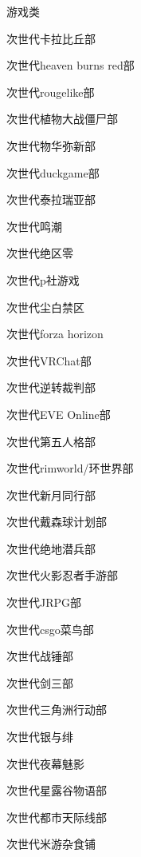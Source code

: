 \begin{multicols}{3}
\begin{categorysection}{游戏类}
        \item 次世代卡拉比丘部
        \item 次世代heaven burns red部
        \item 次世代rougelike部
        \item 次世代植物大战僵尸部
        \item 次世代物华弥新部
        \item 次世代duckgame部
        \item 次世代泰拉瑞亚部
        \item 次世代鸣潮
        \item 次世代绝区零
        \item 次世代p社游戏
        \item 次世代尘白禁区
        \item 次世代forza horizon
        \item 次世代VRChat部
        \item 次世代逆转裁判部
        \item 次世代EVE Online部
        \item 次世代第五人格部
        \item 次世代rimworld/环世界部
        \item 次世代新月同行部
        \item 次世代戴森球计划部
        \item 次世代绝地潜兵部
        \item 次世代火影忍者手游部
        \item 次世代JRPG部
        \item 次世代csgo菜鸟部
        \item 次世代战锤部
        \item 次世代剑三部
        \item 次世代三角洲行动部
        \item 次世代银与绯
        \item 次世代夜幕魅影
        \item 次世代星露谷物语部
        \item 次世代都市天际线部
        \item 次世代米游杂食铺
    \end{categorysection}


\end{multicols}
